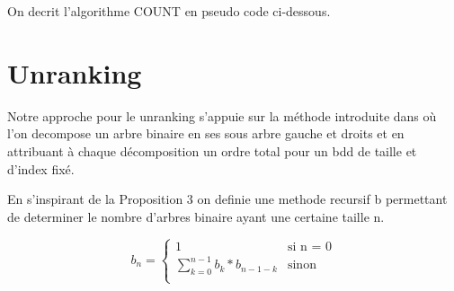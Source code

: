 \documentclass[french]{article}
\begin{document}
On decrit l'algorithme COUNT en pseudo code ci-dessous.
\begin{algorithm}
  \begin{algorithmic}[1]
    \Statex
      \State {}
      \State {} 
        \State {}
            \State {}
        \EndIf
      \Else
            \State {}
                \State {}
            \Else
                    \State {}
                \EndFor
            \EndIf
                \State {}
                \State {}
                    \State {}
                \Else
                        \State {}
                    \EndFor
                \EndIf
                    \State {}
                    \State {}
                        \State {}
                    \Else
                        \State {}
                    \EndIf\EndFor\EndFor\EndFor\EndIf
      \State {}
    \EndFunction
  \end{algorithmic}
\end{algorithm}
\newpage
\section{Unranking}
Notre approche pour le unranking s'appuie sur la méthode introduite dans \cite{wilf} où l'on decompose un arbre binaire en ses sous arbre gauche et droits et en attribuant à chaque décomposition un ordre total pour un bdd de taille et d'index fixé.

En s'inspirant de la Proposition 3 on definie une methode recursif b permettant de determiner le nombre d'arbres binaire ayant une certaine taille n.

\begin{equation}
    b_n =
    \begin{cases}
        1 & \text{si n = 0}\\
        \sum_{k=0}^{n-1}b_k*b_{n-1-k}  & \text{sinon}\\
    \end{cases}      
\end{equation}
\end{document}

